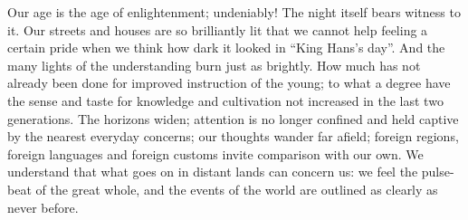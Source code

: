 \documentclass[12pt,a4paper,openany]{book}
\newcommand{\opage}[1]{\marginnote{\footnotesize\textit{[#1]}}}
\begin{document}
Our age is the age of enlightenment; undeniably! The night
itself bears witness to it. Our streets and houses are
so brilliantly lit that we cannot help
feeling a certain pride when we think how dark it
looked in ``King Hans's day''. And the many lights of the
understanding burn just as brightly. How much has
not already been done for improved instruction of the young;
to what a degree have the sense and taste for knowledge
and cultivation not increased in the last two generations.
The horizons widen; attention is
no longer confined and held captive by the nearest
everyday concerns; our thoughts wander far afield;
foreign regions, foreign languages and foreign customs
invite comparison with our own. We understand
that what goes on in distant lands can concern
\setcounter{footnote}{0}%
\opage{55}us: we feel the pulse-beat of the great whole, and the events of the world
are outlined as clearly as
never before.
\end{document}
